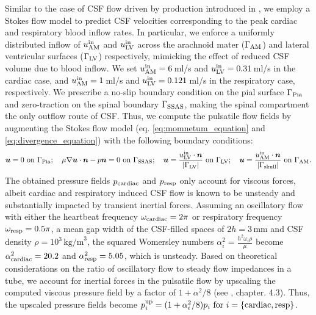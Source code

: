 Similar to the case of CSF flow driven by production introduced in , we employ a Stokes flow model to predict CSF velocities corresponding to the peak cardiac and respiratory blood inflow rates. In particular, we enforce a uniformly distributed inflow of $u^{\rm in}_{\rm AM}$ and $u^{\rm in}_{\rm LV}$ across the arachnoid mater ($\Gamma_{\rm AM}$) and lateral ventricular surfaces ($\Gamma_{\rm LV}$) respectively, mimicking the effect of reduced CSF volume due to blood inflow. We set $u^{\rm in}_{\rm AM} = 6\,$ml/s \cite{causemann2022human,baledent2014imaging} and $u^{\rm in}_{\rm LV}=0.31\,$ml/s \cite{vinje2019respiratory} in the cardiac case, and $u^{\rm{in}}_{\rm{AM}} = 1\,$ml/s \cite{gutierrez2022effect} and $u^{\rm in}_{\rm{LV}}=0.121\,$ml/s \cite{liu2024using} in the respiratory case, respectively.
We prescribe a no-slip boundary condition on the pial surface $\Gamma_{\rm Pia}$ and zero-traction on the spinal boundary $\Gamma_{\rm SSAS}$, making the spinal compartment the only outflow route of CSF. Thus, we compute the pulsatile flow fields by augmenting the Stokes flow model (eq. \ref{eq:momnetum_equation} and \ref{eq:divergence_equation}) with the following boundary conditions:
\begin{equation}\label{eq:cardiac_flow_bcs}
    \bm u = 0 \text{ on } \Gamma_{\rm Pia}; \quad 
    \mu \nabla \bm u \cdot \bm n - p \bm n = 0 \text{ on } \Gamma_{\rm SSAS}; \quad 
    \bm u = \frac{u^{\rm in}_{\rm LV} \cdot \bm n}{|\Gamma_{\rm LV}|} \text{ on } \Gamma_{\rm LV}; \quad
    \bm u = \frac{u^{\rm in}_{\rm AM} \cdot \bm n}{|\Gamma_{\rm skull}|} \text{ on } \Gamma_{\rm AM}.
\end{equation}
The obtained pressure fields $p_{\rm cardiac}$ and $p_{\rm resp}$ only account for viscous forces, albeit cardiac and respiratory induced CSF flow is known to be unsteady and substantially impacted by transient inertial forces. Assuming an oscillatory flow with either the heartbeat frequency $\omega_{\rm cardiac} = 2 \pi$ or respiratory frequency $\omega_{\rm resp} = 0.5 \pi$, a mean gap width of the CSF-filled spaces of $2h=3$\,mm and CSF density $\rho=10^3\,\text{kg/m}^3$, the squared Womersley numbers $\alpha_i^2 = \frac{h^2 \omega_{i} \rho}{\mu}$ become $\alpha_{\rm cardiac}^2 = 20.2$ and $\alpha_{\rm resp}^2=5.05$, which is unsteady. Based on theoretical considerations on the ratio of oscillatory flow to steady flow impedances in a tube, we account for inertial forces in the pulsatile flow by upscaling the computed viscous pressure field by a factor of $1 + \alpha^2 / 8$ (see \cite{van1998cardiovascular}, chapter. 4.3). Thus, the upscaled pressure fields become $p^{\rm up}_{i}= (1 + \alpha_{i}^2 / 8)p_i \text{ for } i = \{\mathrm{cardiac}, \mathrm{resp}\}$.


